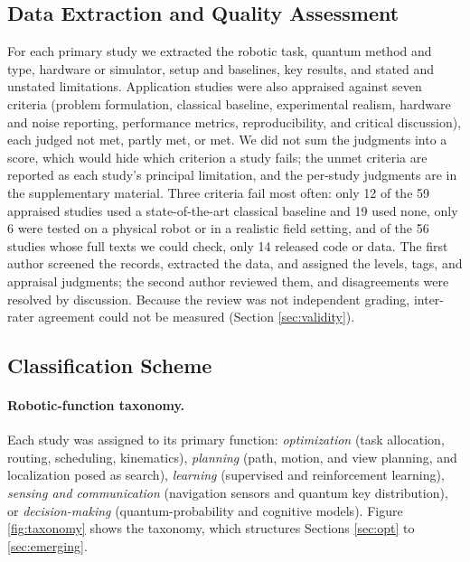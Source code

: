 \documentclass[acmsmall,screen,review]{acmart}
\begin{document}
\subsection{Data Extraction and Quality Assessment}\label{sec:extraction}
For each primary study we extracted the robotic task, quantum method and type, hardware or simulator, setup and baselines, key results, and stated and unstated limitations. Application studies were also appraised against seven criteria (problem formulation, classical baseline, experimental realism, hardware and noise reporting, performance metrics, reproducibility, and critical discussion), each judged not met, partly met, or met. We did not sum the judgments into a score, which would hide which criterion a study fails; the unmet criteria are reported as each study's principal limitation, and the per-study judgments are in the supplementary material. Three criteria fail most often: only 12 of the 59 appraised studies used a state-of-the-art classical baseline and 19 used none, only 6 were tested on a physical robot or in a realistic field setting, and of the 56 studies whose full texts we could check, only 14 released code or data. The first author screened the records, extracted the data, and assigned the levels, tags, and appraisal judgments; the second author reviewed them, and disagreements were resolved by discussion. Because the review was not independent grading, inter-rater agreement could not be measured (Section \ref{sec:validity}).

\subsection{Classification Scheme}\label{sec:classification}
\paragraph{Robotic-function taxonomy.} Each study was assigned to its primary function: \emph{optimization} (task allocation, routing, scheduling, kinematics), \emph{planning} (path, motion, and view planning, and localization posed as search), \emph{learning} (supervised and reinforcement learning), \emph{sensing and communication} (navigation sensors and quantum key distribution), or \emph{decision-making} (quantum-probability and cognitive models). Figure \ref{fig:taxonomy} shows the taxonomy, which structures Sections \ref{sec:opt} to \ref{sec:emerging}.
\end{document}
